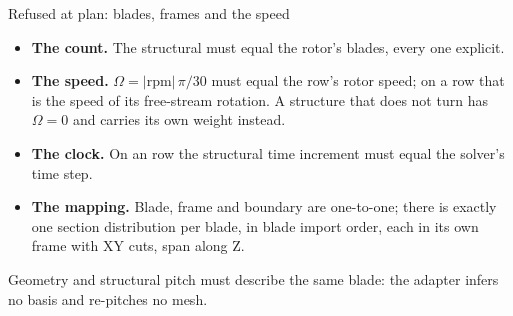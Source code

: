 \begin{frame}{Refused at plan: blades, frames and the speed}
\begin{itemize}\small
  \item \textbf{The count.} The structural  must equal the
        rotor's blades, every one explicit.
  \item \textbf{The speed.} \(\Omega = |\mathrm{rpm}|\,\pi/30\) must equal the
        row's rotor speed; on a  row that is the speed of
        its free-stream rotation. A structure that does not turn has
        \(\Omega = 0\) and carries its own weight instead.
  \item \textbf{The clock.} On an  row the structural time
        increment must equal the solver's time step.
  \item \textbf{The mapping.} Blade, frame and boundary are one-to-one; there
        is exactly one section distribution per blade, in blade import order,
        each in its own frame with XY cuts, span along Z.
\end{itemize}
{\scriptsize Geometry and structural pitch must describe the same blade: the
adapter infers no basis and re-pitches no mesh.\par}
\end{frame}


